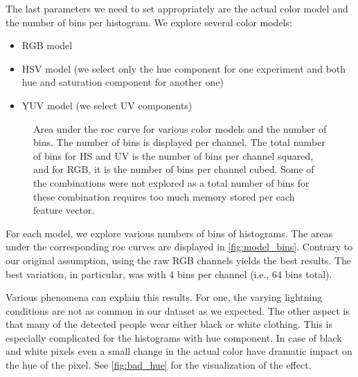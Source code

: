 The last parameters we need to set appropriately are the actual color model
and the number of bins per histogram. We explore several color models:

\begin{itemize}
    \item RGB model
    \item HSV model (we select only the hue component for one experiment and both hue and saturation component for another one)
    \item YUV model (we select UV components)
\end{itemize}

\begin{figure}
    \centering
    \def\svgwidth{\columnwidth}
    \Large
    \scalebox{0.7}{}
    \caption[Area under the ROC curve for various color models and the number of bins]{Area under the \gls{roc} curve for various color models and the number of bins. The number of bins is displayed per channel. The total number of bins for HS and UV is the number of bins per channel squared, and for RGB, it is the number of bins per channel cubed. Some of the combinations were not explored as a total number of bins for these combination requires too much memory stored per each feature vector.}
    \label{fig:model_bins}
\end{figure}

For each model, we explore various numbers of bins of histograms. The areas under the corresponding \gls{roc} curves are displayed in \autoref{fig:model_bins}. Contrary to our original assumption, using the raw RGB channels yields the best results. The best variation, in particular, was with 4 bins per channel (i.e., 64 bins total).

Various phenomena can explain this results. For one, the varying lightning
conditions are not as common in our dataset as we expected. The other aspect is that many of the detected people wear either black or white clothing. This is especially complicated for the histograms with hue component. In case of black and white pixels even a small change in the actual color have dramatic impact on the hue of the pixel. See \autoref{fig:bad_hue} for the visualization of the effect. 

